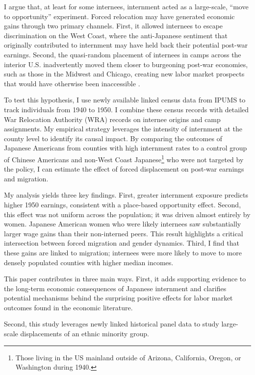 \documentclass[12pt]{article}
\begin{document}
I argue that, at least for some internees,
internment acted as a large-scale, ``move to opportunity'' experiment.
Forced relocation may have generated economic gains through two primary channels.
First, it allowed internees to escape discrimination on the West Coast,
where the anti-Japanese sentiment that originally contributed to internment
may have held back their potential post-war earnings.
Second, the quasi-random placement of internees in camps across the interior U.S.
inadvertently moved them closer to burgeoning post-war economies,
such as those in the Midwest and Chicago,
creating new labor market prospects that would have otherwise been inaccessible
\citep{austinEastwardPioneersJapanese2007}.

To test this hypothesis,
I use newly available linked census data from IPUMS
to track individuals from 1940 to 1950.
I combine these census records with detailed War Relocation Authority (WRA)
records on internee origins and camp assignments.
My empirical strategy leverages the intensity of internment at the county level
to identify its causal impact.
By comparing the outcomes of Japanese Americans
from counties with high internment rates to a control group of Chinese Americans
and non-West Coast Japanese\footnote{Those living in the US mainland outside of Arizona, California, Oregon, or Washington during 1940.}
who were not targeted by the policy,
I can estimate the effect of forced displacement on post-war earnings
and migration.

My analysis yields three key findings.
First,
greater internment exposure predicts higher 1950 earnings,
consistent with a place-based opportunity effect.
Second, this effect was not uniform across the population;
it was driven almost entirely by women.
Japanese American women who were likely internees
saw substantially larger wage gains than their non-interned peers.
This result highlights a critical intersection between forced migration
and gender dynamics.
Third, I find that these gains are linked to migration;
internees were more likely to move to
more densely populated counties with higher median incomes.

This paper contributes in three main ways.
First, it adds supporting evidence to the long-term economic consequences
of Japanese internment
and clarifies potential mechanisms behind
the surprising positive effects for labor market outcomes
found in the economic literature.

Second, this study leverages newly linked historical panel data
to study large-scale displacements of an ethnic minority group.
\end{document}
